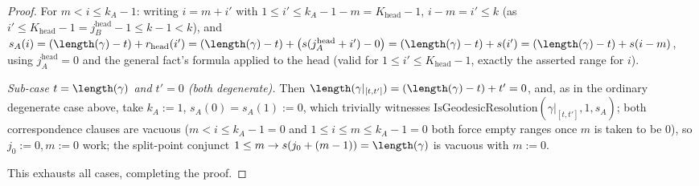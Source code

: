 \begin{proof}
  For $m<i\le k_A-1$: writing $i=m+i'$ with $1\le i'\le k_A-1-m=K_{\mathrm{head}}-1$, $i-m=i'\le k$
  (as $i'\le K_{\mathrm{head}}-1=j_B^{\mathrm{head}}-1\le k-1<k$), and $s_A(i) = (\length(\gamma)-t)+
  r_{\mathrm{head}}(i') = (\length(\gamma)-t) + \bigl(s(j_A^{\mathrm{head}}+i')-0\bigr) =
  (\length(\gamma)-t)+s(i')= (\length(\gamma)-t)+s(i-m)$, using $j_A^{\mathrm{head}}=0$ and the
  general fact's formula applied to the head (valid for $1\le i'\le K_{\mathrm{head}}-1$, exactly
  the asserted range for $i$).

  \emph{Sub-case $t=\length(\gamma)$ and $t'=0$ (both degenerate).} Then $\length(\gamma|_{[t,t']}) =
  (\length(\gamma)-t)+t' = 0$, and, as in the ordinary degenerate case above, take $k_A:=1$,
  $s_A(0)=s_A(1):=0$, which trivially witnesses $\mathrm{IsGeodesicResolution}
  (\gamma|_{[t,t']},1,s_A)$; both correspondence clauses are vacuous ($m<i\le k_A-1=0$ and $1\le
  i\le m\le k_A-1=0$ both force empty ranges once $m$ is taken to be $0$), so $j_0:=0,m:=0$ work;
  the split-point conjunct $1\le m\to s(j_0+(m-1))=\length(\gamma)$ is vacuous with $m:=0$.

  This exhausts all cases, completing the proof.
\end{proof}
